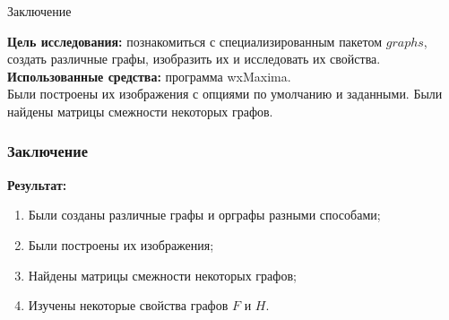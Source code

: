 \documentclass[c]{beamer}  %
\begin{document}
\begin{frame}{Заключение}

\textbf{Цель исследования: } познакомиться с специализированным пакетом $graphs$, создать различные графы, изобразить их и исследовать их свойства. \\

\textbf{Использованные средства: }программа wxMaxima.\\


Были построены их изображения с опциями по умолчанию и заданными. Были найдены матрицы смежности некоторых графов.
\end{frame}
\begin{frame}
\frametitle{Заключение}
\textbf{Результат: } 
\begin{enumerate}
    \item Были созданы различные графы и орграфы разными способами;
    \item Были построены их изображения;
    \item Найдены матрицы смежности некоторых графов;
    \item Изучены некоторые свойства графов $F$ и $H$.
\end{enumerate}
\end{frame}
\end{document}
